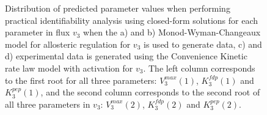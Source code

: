 \documentclass[10pt]{article}
\begin{document}
\begin{figure}[!tbhp]
	\caption{Distribution of predicted parameter values when performing practical identifiability analysis using closed-form solutions for each parameter in flux $v_3$ when the a) and b) Monod-Wyman-Changeaux model for allosteric regulation for $v_3$ is used to generate data, c) and d) experimental data is generated using the Convenience Kinetic rate law model with activation for $v_3$. The left column corresponds to the first root for all three parameters: $V_3^{max}(1)$, $K_3^{fdp}(1)$ and $K_3^{pep}(1)$, and the second column corresponds to the second root of all three parameters in $v_3$: $V_3^{max}(2)$, $K_3^{fdp}(2)$ and $K_3^{pep}(2)$.}\label{fig:parameter_value_v3}
\end{figure}
\end{document}

